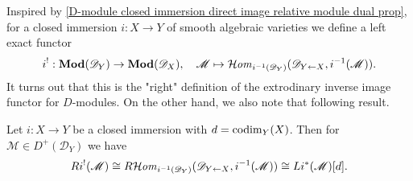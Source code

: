 Inspired by \cref{D-module closed immersion direct image relative module dual prop}, for a closed immersion $i:X\to Y$ of smooth algebraic varieties we define a left exact functor
\[i^!:\mathbf{Mod}(\mathscr{D}_Y)\to\mathbf{Mod}(\mathscr{D}_X),\quad \mathscr{M}\mapsto \operatorname{\mathcal{H}\hspace*{-0.4pt}\textit{om}\hspace{0.5pt}}_{i^{-1}(\mathscr{D}_Y)}(\mathscr{D}_{Y\leftarrow X},i^{-1}(\mathscr{M})).\]
It turns out that this is the "right" definition of the extrodinary inverse image functor for $D$-modules. On the other hand, we also note that following result.
\begin{proposition}\label{D-module upper shrink for closed immersion char}
Let $i:X\to Y$ be a closed immersion with $d=\mathrm{codim}_Y(X)$. Then for $\mathscr{M}\in D^+(\mathscr{D}_Y)$ we have
\[Ri^!(\mathscr{M})\cong R\!\operatorname{\mathcal{H}\hspace*{-0.4pt}\textit{om}\hspace{0.5pt}}_{i^{-1}(\mathscr{D}_Y)}(\mathscr{D}_{Y\leftarrow X},i^{-1}(\mathscr{M}))\cong Li^*(\mathscr{M})[d].\]
\end{proposition}
